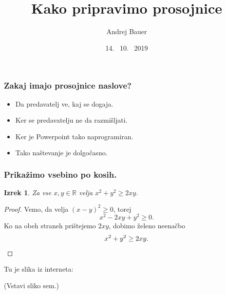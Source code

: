 \documentclass[14pt]{beamer}
\newtheorem{izrek}{Izrek}
\begin{document}
\title{Kako pripravimo prosojnice}
\author{Andrej Bauer}
\date{14. \ 10. \ 2019}

\begin{frame}
  \titlepage

\end{frame}

\begin{frame}
  \frametitle{Zakaj imajo prosojnice naslove?}

  \begin{itemize}
  \item Da predavatelj ve, kaj se dogaja.
  \item Ker se predavatelju ne da razmišljati.
  \item Ker je Powerpoint tako naprogramiran.
  \item Tako naštevanje je dolgočasno.
  \end{itemize}


\end{frame}

\begin{frame}
  \frametitle{Prikažimo vsebino po kosih.}

  \begin{izrek}
    Za vse $x, y \in \mathbb{R}$ velja $x^2 + y^2 \geq 2 x y$.
  \end{izrek}

  \pause

  \begin{proof}
    Vemo, da velja $(x - y)^2 \geq 0$, torej
    \begin{equation*}
      x^2 - 2 x y + y^2 \geq 0.
    \end{equation*}
    \pause
    Ko na obeh straneh prištejemo $2 x y$, dobimo želeno neenačbo
    \begin{equation*}
      x^2 + y^2 \geq 2 x y. \qedhere
    \end{equation*}
  \end{proof}

\end{frame}

\begin{frame}
  Tu je slika iz interneta:
  \begin{center}
    (Vstavi sliko sem.)
  \end{center}


\end{frame}
\end{document}
